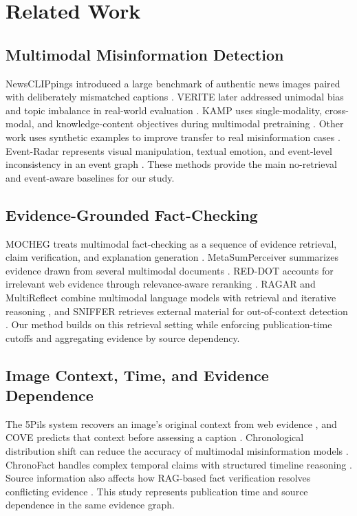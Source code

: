 \section{Related Work}

\subsection{Multimodal Misinformation Detection}

NewsCLIPpings introduced a large benchmark of authentic news images paired with deliberately mismatched captions \cite{luo2021newsclippings}. VERITE later addressed unimodal bias and topic imbalance in real-world evaluation \cite{papadopoulos2024verite}. KAMP uses single-modality, cross-modal, and knowledge-content objectives during multimodal pretraining \cite{zhang2025kamp}. Other work uses synthetic examples to improve transfer to real misinformation cases \cite{zeng2024synthetic}. Event-Radar represents visual manipulation, textual emotion, and event-level inconsistency in an event graph \cite{ma2024eventradar}. These methods provide the main no-retrieval and event-aware baselines for our study.

\subsection{Evidence-Grounded Fact-Checking}

MOCHEG treats multimodal fact-checking as a sequence of evidence retrieval, claim verification, and explanation generation \cite{yao2023mocheg}. MetaSumPerceiver summarizes evidence drawn from several multimodal documents \cite{chen2024metasum}. RED-DOT accounts for irrelevant web evidence through relevance-aware reranking \cite{papadopoulos2025reddot}. RAGAR and MultiReflect combine multimodal language models with retrieval and iterative reasoning \cite{khaliq2024ragar,kangur2025multireflect}, and SNIFFER retrieves external material for out-of-context detection \cite{qi2024sniffer}. Our method builds on this retrieval setting while enforcing publication-time cutoffs and aggregating evidence by source dependency.

\subsection{Image Context, Time, and Evidence Dependence}

The 5Pils system recovers an image's original context from web evidence \cite{tonglet2024image}, and COVE predicts that context before assessing a caption \cite{tonglet2025cove}. Chronological distribution shift can reduce the accuracy of multimodal misinformation models \cite{stepanova2023temporal}. ChronoFact handles complex temporal claims with structured timeline reasoning \cite{barik2025chronofact}. Source information also affects how RAG-based fact verification resolves conflicting evidence \cite{ge2025conflicting}. This study represents publication time and source dependence in the same evidence graph.

